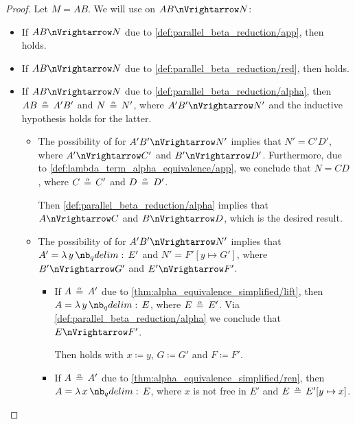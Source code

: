 \begin{proof}
   Let \( M = AB \). We will use  on \( AB \pred N \):
  \begin{itemize}
    \item If \( AB \pred N \) due to \ref{def:parallel_beta_reduction/app}, then  holds.

    \item If \( AB \pred N \) due to \ref{def:parallel_beta_reduction/red}, then  holds.

    \item If \( AB \pred N \) due to \ref{def:parallel_beta_reduction/alpha}, then \( AB \aequiv A' B' \) and \( N \aequiv N' \), where \( A' B' \pred N' \) and the inductive hypothesis holds for the latter.

    \begin{itemize}
      \item The possibility of  for \( A' B' \pred N' \) implies that \( N' = C' D' \), where \( A' \pred C' \) and \( B' \pred D' \). Furthermore, due to \ref{def:lambda_term_alpha_equivalence/app}, we conclude that \( N = CD \), where \( C \aequiv C' \) and \( D \aequiv D' \).

      Then \ref{def:parallel_beta_reduction/alpha} implies that \( A \pred C \) and \( B \pred D \), which is the desired result.

      \item The possibility of  for \( A' B' \pred N' \) implies that \( A' = \qabs y E' \) and \( N' = F'[y \mapsto G'] \), where \( B' \pred G' \) and \( E' \pred F' \).

      \begin{itemize}
        \item If \( A \aequiv A' \) due to \ref{thm:alpha_equivalence_simplified/lift}, then \( A = \qabs y E \), where \( E \aequiv E' \). Via \ref{def:parallel_beta_reduction/alpha} we conclude that \( E \pred F' \).

        Then  holds with \( x \coloneqq y \), \( G \coloneqq G' \) and \( F \coloneqq F' \).

        \item If \( A \aequiv A' \) due to \ref{thm:alpha_equivalence_simplified/ren}, then \( A = \qabs x E \), where \( x \) is not free in \( E' \) and \( E \aequiv E'[y \mapsto x] \).


\end{itemize}
\end{itemize}
\end{itemize}
\end{proof}
